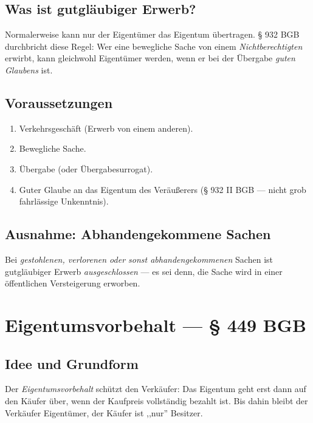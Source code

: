 \documentclass[11pt, a4paper]{article}
\begin{document}
\subsection{Was ist gutgläubiger Erwerb?}

Normalerweise kann nur der Eigentümer das Eigentum übertragen. § 932 BGB durchbricht
diese Regel: Wer eine bewegliche Sache von einem \emph{Nichtberechtigten} erwirbt,
kann gleichwohl Eigentümer werden, wenn er bei der Übergabe \emph{guten Glaubens} ist.

\subsection{Voraussetzungen}

\begin{enumerate}[itemsep=2pt]
  \item Verkehrsgeschäft (Erwerb von einem anderen).
  \item Bewegliche Sache.
  \item Übergabe (oder Übergabesurrogat).
  \item Guter Glaube an das Eigentum des Veräußerers (§ 932 II BGB --- nicht grob fahrlässige Unkenntnis).
\end{enumerate}

\subsection{Ausnahme: Abhandengekommene Sachen}

\begin{merksatz}[title={§ 935 BGB}]
Bei \emph{gestohlenen, verlorenen oder sonst abhandengekommenen} Sachen ist
gutgläubiger Erwerb \emph{ausgeschlossen} --- es sei denn, die Sache wird in einer
öffentlichen Versteigerung erworben.
\end{merksatz}

\section{Eigentumsvorbehalt --- § 449 BGB}

\subsection{Idee und Grundform}

Der \emph{Eigentumsvorbehalt} schützt den Verkäufer: Das Eigentum geht erst dann
auf den Käufer über, wenn der Kaufpreis vollständig bezahlt ist. Bis dahin bleibt
der Verkäufer Eigentümer, der Käufer ist ,,nur'' Besitzer.
\end{document}
